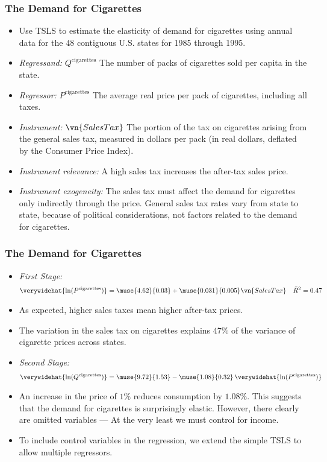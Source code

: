 

\begin{frame}
\frametitle{The Demand for Cigarettes}
\begin{itemize}
\item Use TSLS to estimate the elasticity of demand for cigarettes using annual data for the $48$ contiguous U.S. states for 1985 through 1995.
\item \emph{Regressand:} 
$Q^{\text{cigarettes}}$
\newlinequad
The number of packs of cigarettes sold per capita in the state.
\item \emph{Regressor:} 
$P^{\text{cigarettes}}$
\newlinequad
The average real price per pack of cigarettes, including all taxes.
\item \emph{Instrument:} 
$\vn{SalesTax}$
\newlinequad
The portion of the tax on cigarettes arising from the general sales tax, measured in dollars per pack (in real dollars, deflated by the Consumer Price Index). 
\item \emph{Instrument relevance:}
A high sales tax increases the after-tax sales price.
\item \emph{Instrument exogeneity:}
The sales tax must affect the demand for cigarettes only indirectly through the price. General sales tax rates vary from state to state, because of political considerations, not factors related to the demand for cigarettes. 
\end{itemize}
\end{frame}


\begin{frame}
\frametitle{The Demand for Cigarettes}
\begin{itemize}
\item \emph{First Stage:} 
\begin{align*}
\verywidehat{\ln(P^{\text{cigarettes}})} 
  = \muse{4.62}{0.03} + \muse{0.031}{0.005} \vn{SalesTax}
    \quad \bar{R}^2 = 0.47
\end{align*}
\item As expected, higher sales taxes mean higher after-tax prices. 
\item The variation in the sales tax on cigarettes explains $47\%$ of the variance of cigarette prices across states.
\item \emph{Second Stage:} 
\begin{align*}
\verywidehat{\ln(Q^{\text{cigarettes}})} 
  = \muse{9.72}{1.53} -\muse{1.08}{0.32}\, \verywidehat{\ln(P^{\text{cigarettes}})}
\end{align*}
\item An increase in the price of $1\%$ reduces consumption by $1.08\%$. This suggests that the demand for cigarettes is surprisingly elastic. However, there clearly are omitted variables --- At the very least we must control for income. 
\item To include control variables in the regression, we extend the simple TSLS to allow multiple regressors. 
\end{itemize}
\end{frame}
